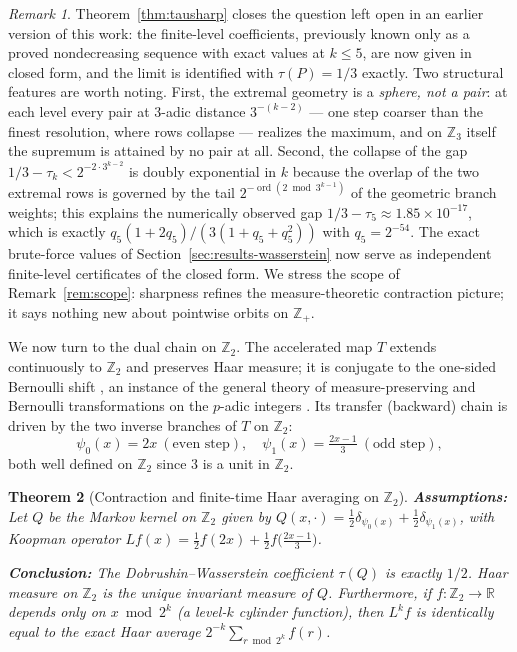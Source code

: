 \documentclass[11pt]{amsart}
\newtheorem{theorem}{Theorem}[section]
\theoremstyle{definition}
\theoremstyle{remark}
\newtheorem{remark}[theorem]{Remark}
\newcommand{\Z}{\mathbb{Z}}
\newcommand{\R}{\mathbb{R}}
\newcommand{\Ztwo}{\Z_2}
\newcommand{\Zthree}{\Z_3}
\begin{document}
\begin{remark}\label{rem:tauk}
Theorem~\ref{thm:tausharp} closes the question left open in an earlier version of this work: the finite-level coefficients, previously known only as a proved nondecreasing sequence with exact values at $k \le 5$, are now given in closed form, and the limit is identified with $\tau(P) = 1/3$ exactly. Two structural features are worth noting. First, the extremal geometry is a \emph{sphere, not a pair}: at each level every pair at $3$-adic distance $3^{-(k-2)}$ --- one step coarser than the finest resolution, where rows collapse --- realizes the maximum, and on $\Zthree$ itself the supremum is attained by no pair at all. Second, the collapse of the gap $1/3 - \tau_k < 2^{-2\cdot 3^{k-2}}$ is doubly exponential in $k$ because the overlap of the two extremal rows is governed by the tail $2^{-\operatorname{ord}(2 \bmod 3^{k-1})}$ of the geometric branch weights; this explains the numerically observed gap $1/3 - \tau_5 \approx 1.85\times 10^{-17}$, which is exactly $q_5(1+2q_5)/(3(1+q_5+q_5^2))$ with $q_5 = 2^{-54}$. The exact brute-force values of Section~\ref{sec:results-wasserstein} now serve as independent finite-level certificates of the closed form. We stress the scope of Remark~\ref{rem:scope}: sharpness refines the measure-theoretic contraction picture; it says nothing new about pointwise orbits on $\Z_+$.
\end{remark}

We now turn to the dual chain on $\Ztwo$. The accelerated map $T$ extends continuously to $\Ztwo$ and preserves Haar measure; it is conjugate to the one-sided Bernoulli shift \cite{terras1976,lagarias1985,bernsteinlagarias1996}, an instance of the general theory of measure-preserving and Bernoulli transformations on the $p$-adic integers \cite{kingsberyetal2009,kingsberyetal2011}. Its transfer (backward) chain is driven by the two inverse branches of $T$ on $\Ztwo$:
\[
\psi_0(x) = 2x \ (\text{even step}), \quad
\psi_1(x) = \tfrac{2x-1}{3} \ (\text{odd step}),
\]
both well defined on $\Ztwo$ since $3$ is a unit in $\Ztwo$.

\begin{theorem}[Contraction and finite-time Haar averaging on $\Ztwo$]\label{thm:z2}
\textbf{Assumptions:} Let $Q$ be the Markov kernel on $\Ztwo$ given by $Q(x,\cdot) = \tfrac12 \delta_{\psi_0(x)} + \tfrac12 \delta_{\psi_1(x)}$, with Koopman operator $Lf(x) = \tfrac12 f(2x) + \tfrac12 f\bigl(\tfrac{2x-1}{3}\bigr)$.

\textbf{Conclusion:} The Dobrushin--Wasserstein coefficient $\tau(Q)$ is exactly $1/2$. Haar measure on $\Ztwo$ is the unique invariant measure of $Q$. Furthermore, if $f : \Ztwo \to \R$ depends only on $x \bmod 2^k$ (a level-$k$ cylinder function), then $L^k f$ is identically equal to the exact Haar average $2^{-k} \sum_{r \bmod 2^k} f(r)$.
\end{theorem}
\end{document}
